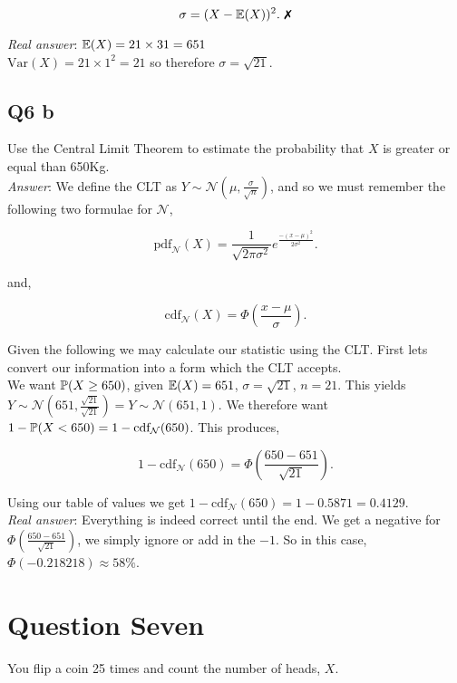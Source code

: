\documentclass{article}
\begin{document}
            \[\sigma = (X - \E(X))^2. ~ \xmark\]

            \textit{Real answer}: $\mathbb{E}(X) = 21 \times 31 = 651$\\

            $\text{Var}(X) = 21 \times 1^2 = 21$ so therefore $\sigma = \sqrt{21}$.

        \subsection{Q6 b}
            Use the Central Limit Theorem to estimate the probability that $X$ is greater or equal than 650Kg.\\

            \textit{Answer}: We define the CLT as $Y \sim \mathcal{N}(\mu, \frac{\sigma}{\sqrt{n}})$, and so we must remember the following two formulae for $\mathcal{N}$, 

            \[\text{pdf}_{\mathcal{N}}(X) = \frac{1}{\sqrt{2\pi\sigma^2}}e^{\frac{-(x-\mu)^2}{2\sigma^2}}.\]

            and,

            \[\text{cdf}_{\mathcal{N}}(X) = \Phi\left( \frac{x-\mu}{\sigma} \right).\]

            Given the following we may calculate our statistic using the CLT. First lets convert our information into a form which the CLT accepts.\\

            We want $\mathbb{P}(X \geq 650)$, given $\mathbb{E}(X) = 651$, $\sigma = \sqrt{21}$, $n = 21$. This yields $Y\sim\mathcal{N}\left( 651, \frac{\sqrt{21}}{\sqrt{21}} \right) = Y\sim\mathcal{N}\left( 651, 1 \right)$. We therefore want $1 - \mathbb{P}(X < 650) = 1- \text{cdf}_{\mathcal{N}}(650)$. This produces,
            
            \[1 - \text{cdf}_{\mathcal{N}}(650) = \Phi\left( \frac{650 - 651}{\sqrt{21}} \right).\]

            Using our table of values we get $1 - \text{cdf}_{\mathcal{N}}(650) = 1 - 0.5871 = 0.4129$.\\

            \textit{Real answer}: Everything is indeed correct until the end. We get a negative for $\Phi\left( \frac{650 - 651}{\sqrt{21}} \right)$, we simply ignore or add in the $-1$. So in this case, $\Phi(-0.218218) \approx 58\%$.

    \section{Question Seven}
        You flip a coin 25 times and count the number of heads, $X$.
\end{document}

